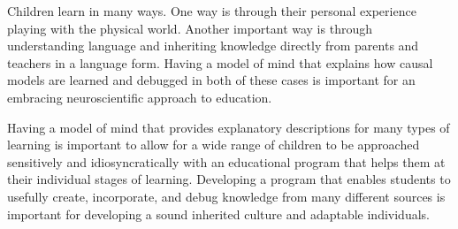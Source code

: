 Children learn in many ways.  One way is through their personal
experience playing with the physical world.  Another important way is
through understanding language and inheriting knowledge directly from
parents and teachers in a language form.  Having a model of mind that
explains how causal models are learned and debugged in both of these
cases is important for an embracing neuroscientific approach to
education.

Having a model of mind that provides explanatory descriptions for many
types of learning is important to allow for a wide range of children
to be approached sensitively and idiosyncratically with an educational
program that helps them at their individual stages of learning.
Developing a program that enables students to usefully create,
incorporate, and debug knowledge from many different sources is
important for developing a sound inherited culture and adaptable
individuals.

